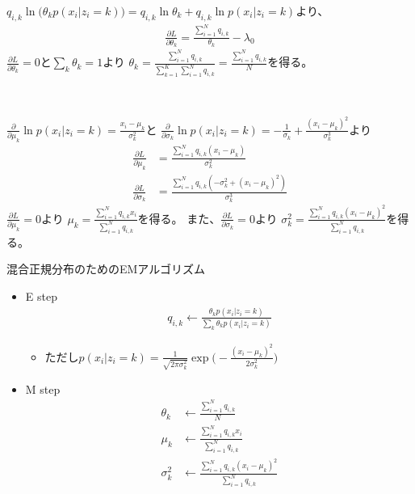 \documentclass[aspectratio=169,unicode,dvipdfmx,14pt]{beamer}
\begin{document}
\begin{frame}
\FontMath
$q_{i,k} \ln \big( \theta_k p(x_i | z_i = k) \big)
= q_{i,k} \ln \theta_k + q_{i,k} \ln p(x_i | z_i = k)$より、
\begin{align}
\frac{\partial L}{\partial \theta_k}
= \frac{ \sum_{i=1}^N  q_{i,k} }{ \theta_k } - \lambda_0
\end{align}
$\frac{\partial L}{\partial \theta_k} = 0$と$\sum_k \theta_k = 1$より
$\theta_k = \frac{ \sum_{i=1}^N q_{i,k} }{ \sum_{k=1}^K \sum_{i=1}^N q_{i,k} } = \frac{ \sum_{i=1}^N q_{i,k} }{ N }$を得る。

\

$\frac{\partial }{\partial \mu_k} \ln p(x_i | z_i = k) = \frac{ x_i - \mu_k }{\sigma_k^2}$と
$\frac{\partial }{\partial \sigma_k} \ln p(x_i | z_i = k) = - \frac{1}{\sigma_k} + \frac{ (x_i - \mu_k)^2 }{\sigma_k^3}$より
\begin{align}
\frac{\partial L}{\partial \mu_k}
& = \frac{ \sum_{i=1}^N q_{i,k} (x_i - \mu_k) }{\sigma_k^2} \\
\frac{\partial L}{\partial \sigma_k}
& = \frac{ \sum_{i=1}^N q_{i,k} ( - \sigma_k^2 + (x_i - \mu_k)^2 ) }{\sigma_k^3}
\end{align}
$\frac{\partial L}{\partial \mu_k} = 0$より
$\mu_k = \frac{ \sum_{i=1}^N q_{i,k} x_i }{ \sum_{i=1}^N q_{i,k} }$を得る。
また、$\frac{\partial L}{\partial \sigma_k} = 0$より
$\sigma_k^2 = \frac{ \sum_{i=1}^N q_{i,k} (x_i - \mu_k)^2 }{ \sum_{i=1}^N q_{i,k} }$を得る。
\end{frame}

\begin{frame}{混合正規分布のためのEMアルゴリズム}
\vspace{-.1in}
\begin{itemize}
\item E step
\vspace{-.1in}
\begin{align}
q_{i,k} \leftarrow \frac{ \theta_k p(x_i | z_i = k) }{ \sum_k \theta_k p(x_i | z_i = k) }
\end{align}
\vspace{-.1in}
\begin{itemize}
\item[] ただし$p(x_i | z_i = k) = \frac{1}{\sqrt{2\pi\sigma_k^2}} \exp\big( - \frac{ (x_i - \mu_k)^2 }{2\sigma_k^2} \big)$
\end{itemize}
\vspace{-.1in}
\item M step
\vspace{-.1in}
\begin{align}
\theta_k & \leftarrow \frac{ \sum_{i=1}^N q_{i,k} }{ N } \\
\mu_k & \leftarrow \frac{ \sum_{i=1}^N q_{i,k} x_i }{ \sum_{i=1}^N q_{i,k} } \\
\sigma_k^2 & \leftarrow \frac{ \sum_{i=1}^N q_{i,k} (x_i - \mu_k)^2 }{ \sum_{i=1}^N q_{i,k} }
\end{align}
\end{itemize}
\end{frame}
\end{document}
